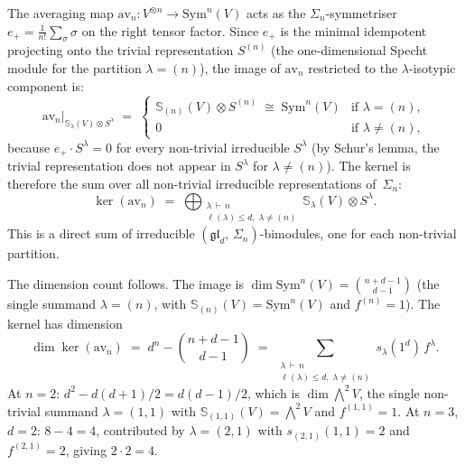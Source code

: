 \begin{remark}
The averaging map $\mathrm{av}_n\colon V^{\otimes n} \to
\mathrm{Sym}^n(V)$ acts as the $\Sigma_n$-symmetriser
$e_+ = \frac{1}{n!}\sum_{\sigma} \sigma$ on the right tensor factor.
Since $e_+$ is the minimal idempotent projecting onto the trivial
representation $S^{(n)}$ (the one-dimensional Specht module for the
partition $\lambda = (n)$), the image of $\mathrm{av}_n$ restricted
to the $\lambda$-isotypic component is:
\[
\mathrm{av}_n\big|_{\mathbb{S}_\lambda(V) \otimes S^\lambda}
\;=\;
\begin{cases}
\mathbb{S}_{(n)}(V) \otimes S^{(n)}
\;\cong\;
\mathrm{Sym}^n(V)
& \text{if } \lambda = (n), \\[4pt]
0 & \text{if } \lambda \neq (n),
\end{cases}
\]
because $e_+ \cdot S^\lambda = 0$ for every non-trivial irreducible
$S^\lambda$ (by Schur's lemma, the trivial representation does not
appear in $S^\lambda$ for $\lambda \neq (n)$). The kernel is therefore
the sum over all non-trivial irreducible representations of~$\Sigma_n$:
\begin{equation}\label{eq:kernel-schur-weyl}
\ker(\mathrm{av}_n)
\;=\;
\bigoplus_{\substack{\lambda \,\vdash\, n \\
\ell(\lambda) \leq d,\;
\lambda \neq (n)}}
\mathbb{S}_\lambda(V) \otimes S^\lambda.
\end{equation}
This is a direct sum of irreducible $(\mathfrak{gl}_d,\,\Sigma_n)$-bimodules,
one for each non-trivial partition.

The dimension count follows. The image is
$\dim\mathrm{Sym}^n(V) = \binom{n+d-1}{d-1}$
(the single summand $\lambda = (n)$, with
$\mathbb{S}_{(n)}(V) = \mathrm{Sym}^n(V)$ and $f^{(n)} = 1$).
The kernel has dimension
\[
\dim\ker(\mathrm{av}_n)
\;=\;
d^n - \binom{n+d-1}{d-1}
\;=\;
\sum_{\substack{\lambda \,\vdash\, n \\
\ell(\lambda) \leq d,\;
\lambda \neq (n)}}
s_\lambda(1^d)\,f^\lambda.
\]
At $n = 2$: $d^2 - d(d{+}1)/2 = d(d{-}1)/2$,
which is $\dim\bigwedge^2 V$, the single non-trivial summand
$\lambda = (1,1)$ with $\mathbb{S}_{(1,1)}(V) = \bigwedge^2 V$
and $f^{(1,1)} = 1$.
At $n = 3$, $d = 2$: $8 - 4 = 4$,
contributed by
$\lambda = (2,1)$ with $s_{(2,1)}(1,1) = 2$ and $f^{(2,1)} = 2$,
giving $2 \cdot 2 = 4$.


\end{remark}
